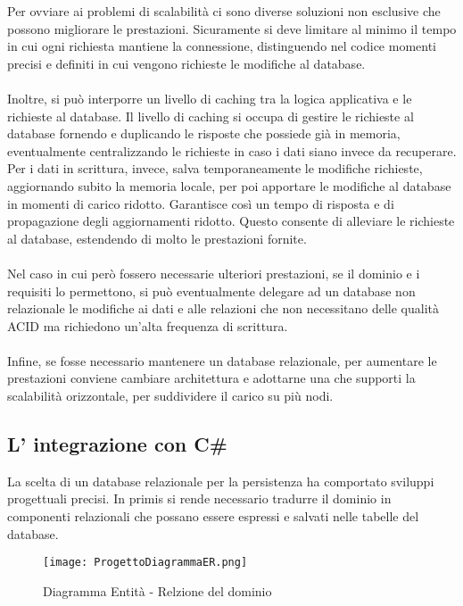 Per ovviare ai problemi di scalabilità ci sono diverse soluzioni non esclusive che possono migliorare le prestazioni. 
Sicuramente si deve limitare al minimo il tempo in cui ogni richiesta mantiene la connessione, 
distinguendo nel codice momenti precisi e definiti in cui vengono richieste le modifiche al database. \\
\\  

Inoltre, si può interporre un livello di caching tra la logica applicativa e le richieste al database. 
Il livello di caching si occupa di gestire le richieste al database fornendo e duplicando le risposte che possiede già in memoria, 
eventualmente centralizzando le richieste in caso i dati siano invece da recuperare. 
Per i dati in scrittura, invece, salva temporaneamente le modifiche richieste, aggiornando subito la memoria locale, 
per poi apportare le modifiche al database in momenti di carico ridotto. 
Garantisce così un tempo di risposta e di propagazione degli aggiornamenti ridotto. 
Questo consente di alleviare le richieste al database, estendendo di molto le prestazioni fornite.\\
\\

Nel caso in cui però fossero necessarie ulteriori prestazioni, se il dominio e i requisiti lo permettono, 
si può eventualmente delegare ad un database non relazionale le modifiche ai dati e alle relazioni che non necessitano delle qualità ACID ma richiedono un’alta frequenza di scrittura.\\
\\ 
Infine, se fosse necessario mantenere un database relazionale, 
per aumentare le prestazioni conviene cambiare architettura e adottarne una che supporti la scalabilità orizzontale, per suddividere il carico su più nodi.
\clearpage


\subsection{L' integrazione con C\#}

La scelta di un database relazionale per la persistenza ha comportato sviluppi progettuali precisi. 
In primis si rende necessario tradurre il dominio in componenti relazionali che possano essere espressi e salvati nelle tabelle del database.

\begin{figure}[h!]
    \centering
    \texttt{[image: ProgettoDiagrammaER.png]}
    \caption{Diagramma Entità - Relzione del dominio}
\end{figure}	

